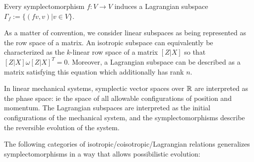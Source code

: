 \begin{lemma}
Every symplectomorphism $f:V\to V$ induces a Lagrangian subspace $\Gamma_f:=\{ (fv, v) | v \in V \}$.
\end{lemma}

As a matter of convention, we consider linear subspaces as being represented as the row space of a matrix.
An isotropic subspace can equivalently be characterized as the $k$-linear row space of a matrix $[Z|X]$ so that $[Z|X] \omega [Z|X]^T = 0$.
Moreover, a Lagrangian subspace can be described as a matrix satisfying this equation which additionally has rank $n$.

In linear mechanical systems, symplectic vector spaces over $\mathbb{R}$ are interpreted as  the phase space: ie the space of all allowable configurations of position and momentum.  The Lagrangian subspaces are interpreted as the initial configurations of the mechanical system, and the symplectomorphisms describe the reversible evolution of the system. 

 The following  categories of isotropic/coisotropic/Lagrangian relations generalizes symplectomorphisms in a way that allows possibilistic evolution:


